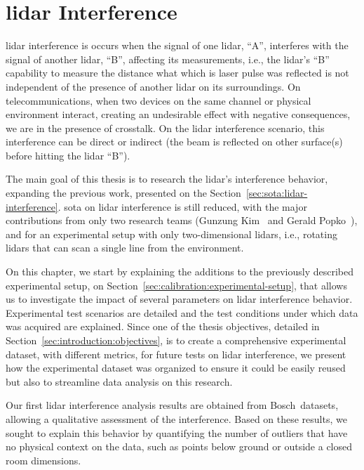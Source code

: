 \chapter{\acs{lidar} Interference}
\label{chapter:lidar-interference}

\ac{lidar} interference is occurs when the signal of one \ac{lidar}, ``A'', interferes with the signal of another \ac{lidar}, ``B'', affecting its measurements, i.e., the \ac{lidar}'s ``B'' capability to measure the distance what which is laser pulse was reflected is not independent of the presence of another \ac{lidar} on its surroundings. On telecommunications, when two devices on the same channel or physical environment interact, creating an undesirable effect with negative consequences, we are in the presence of crosstalk. On the \ac{lidar} interference scenario, this interference can be direct or indirect (the beam is reflected on other surface(s) before hitting the \ac{lidar} ``B'').

The main goal of this thesis is to research the \ac{lidar}'s interference behavior, expanding the previous work, presented on the Section~\ref{sec:sota:lidar-interference}. \acl{sota} on \ac{lidar} interference is still reduced, with the major contributions from only two research teams (Gunzung Kim\etal~\cite{Kim2015c, Kim2017} and Gerald Popko\etal~\cite{Popko2019a, Popko2019b}), and for an experimental setup with only two-dimensional \acp{lidar}, i.e., rotating \acp{lidar} that can scan a single line from the environment.

On this chapter, we start by explaining the additions to the previously described experimental setup, on Section~\ref{sec:calibration:experimental-setup}, that allows us to investigate the impact of several parameters on \ac{lidar} interference behavior. Experimental test scenarios are detailed and the test conditions under which data was acquired are explained. Since one of the thesis objectives, detailed in Section~\ref{sec:introduction:objectives}, is to create a comprehensive experimental dataset, with different metrics, for future tests on \ac{lidar} interference, we present how the experimental dataset was organized to ensure it could be easily reused but also to streamline data analysis on this research.

Our first \ac{lidar} interference analysis results are obtained from Bosch\cp~datasets, allowing a qualitative assessment of the interference. Based on these results, we sought to explain this behavior by quantifying the number of outliers that have no physical context on the data, such as points below ground or outside a closed room dimensions.

